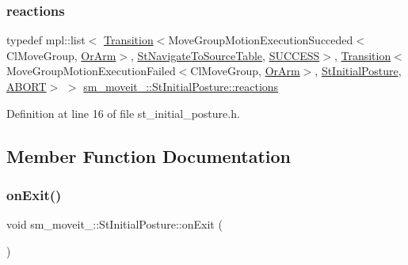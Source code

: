 \subsubsection{\texorpdfstring{reactions}{reactions}}
{\footnotesize\ttfamily typedef mpl\+::list$<$ \hyperlink{classsmacc_1_1Transition}{Transition}$<$Move\+Group\+Motion\+Execution\+Succeded$<$Cl\+Move\+Group, \hyperlink{classsm__moveit__4_1_1OrArm}{Or\+Arm}$>$, \hyperlink{structsm__moveit__4_1_1StNavigateToSourceTable}{St\+Navigate\+To\+Source\+Table}, \hyperlink{structsmacc_1_1default__transition__tags_1_1SUCCESS}{S\+U\+C\+C\+E\+SS}$>$, \hyperlink{classsmacc_1_1Transition}{Transition}$<$Move\+Group\+Motion\+Execution\+Failed$<$Cl\+Move\+Group, \hyperlink{classsm__moveit__4_1_1OrArm}{Or\+Arm}$>$, \hyperlink{structsm__moveit__4_1_1StInitialPosture}{St\+Initial\+Posture}, \hyperlink{structsmacc_1_1default__transition__tags_1_1ABORT}{A\+B\+O\+RT}$>$ $>$ \hyperlink{structsm__moveit__4_1_1StInitialPosture_aa7e1e0f670642dd9378217cb028a42f3}{sm\+\_\+moveit\+\_\+::\+St\+Initial\+Posture\+::reactions}}



Definition at line 16 of file st\+\_\+initial\+\_\+posture.\+h.



\subsection{Member Function Documentation}
\mbox{\label{structsm__moveit__4_1_1StInitialPosture_a91c21def08d344903c12e96c36a2fd23}} 
\subsubsection{\texorpdfstring{on\+Exit()}{onExit()}\hspace{0.1cm}{\footnotesize\ttfamily [1/3]}}
{\footnotesize\ttfamily void sm\+\_\+moveit\+\_\+::\+St\+Initial\+Posture\+::on\+Exit (\begin{DoxyParamCaption}\item[{\hyperlink{structsmacc_1_1default__transition__tags_1_1SUCCESS}{S\+U\+C\+C\+E\+SS}}]{ }\end{DoxyParamCaption})\hspace{0.3cm}{\ttfamily [inline]}}



